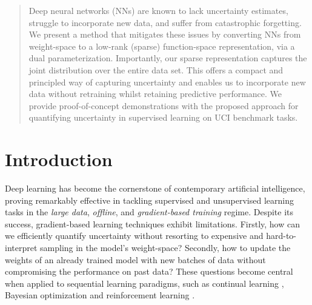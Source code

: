 \documentclass{article}
\begin{document}
\begin{abstract}
Deep neural networks (NNs) are known to lack uncertainty estimates, struggle to incorporate new data, and suffer from catastrophic forgetting. We present a method that mitigates these issues by converting NNs from weight-space to a low-rank (sparse) function-space representation, via a dual parameterization. Importantly, our sparse representation captures the joint distribution over the entire data set. This offers a compact and principled way of capturing uncertainty and enables us to incorporate new data without retraining whilst retaining predictive performance. We provide proof-of-concept demonstrations with the proposed approach for quantifying uncertainty in supervised learning on UCI benchmark tasks.
\end{abstract}

\section{Introduction}
%
Deep learning \citep{goodfellow2016deep} has become the cornerstone of contemporary artificial intelligence, proving remarkably effective in tackling supervised and unsupervised learning tasks in the {\em large data}, {\em offline}, and {\em gradient-based training} regime. Despite its success, gradient-based learning techniques exhibit limitations. Firstly, how can we efficiently quantify uncertainty without resorting to expensive and hard-to-interpret sampling in the model's weight-space? Secondly, how to update the weights of an already trained model with new batches of data without compromising the performance on past data?
These questions become central when applied to sequential learning paradigms, such as continual learning \citep[CL,][]{parisi2019continual, de2021continual}, Bayesian optimization \citep[BO,][]{garnett_bayesoptbook_2022} and reinforcement learning  \citep[RL,][]{sutton2018reinforcement}.
\end{document}
